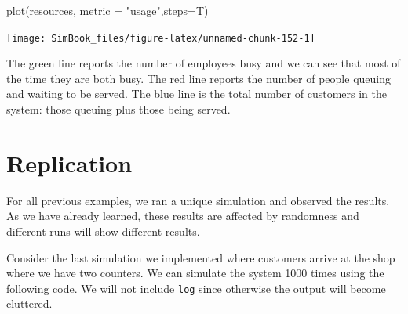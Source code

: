 \documentclass[
]{book}
\newenvironment{Shaded}{\begin{snugshade}}{\end{snugshade}}
\newcommand{\AttributeTok}[1]{\textcolor[rgb]{0.77,0.63,0.00}{#1}}
\newcommand{\FunctionTok}[1]{\textcolor[rgb]{0.00,0.00,0.00}{#1}}
\newcommand{\NormalTok}[1]{#1}
\newcommand{\StringTok}[1]{\textcolor[rgb]{0.31,0.60,0.02}{#1}}
\begin{document}
\begin{Shaded}
\begin{Highlighting}[]
\FunctionTok{plot}\NormalTok{(resources, }\AttributeTok{metric =} \StringTok{"usage"}\NormalTok{,}\AttributeTok{steps=}\NormalTok{T)}
\end{Highlighting}
\end{Shaded}

\begin{center}\texttt{[image: SimBook\_files/figure-latex/unnamed-chunk-152-1]} \end{center}

The green line reports the number of employees busy and we can see that most of the time they are both busy. The red line reports the number of people queuing and waiting to be served. The blue line is the total number of customers in the system: those queuing plus those being served.

\hypertarget{replication}{%
\section{Replication}\label{replication}}

For all previous examples, we ran a unique simulation and observed the results. As we have already learned, these results are affected by randomness and different runs will show different results.

Consider the last simulation we implemented where customers arrive at the shop where we have two counters. We can simulate the system 1000 times using the following code. We will not include \texttt{log} since otherwise the output will become cluttered.
\end{document}
